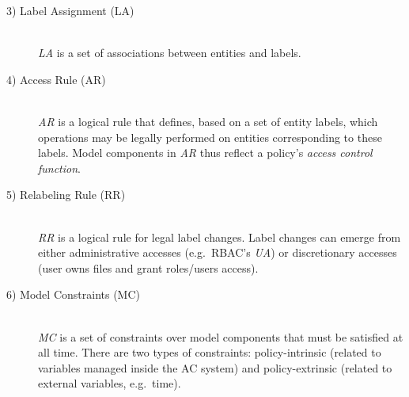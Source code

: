 \documentclass[twoside, openright, 12pt]{book}
\begin{document}
\begin{description}
\item[3) Label Assignment (LA)]\hfill \\
\textit{LA} is a set of associations between entities and labels.


\item[4) Access Rule (AR)]\hfill \\
\textit{AR} is a logical rule that defines, based on a set of entity labels, which operations may be legally performed on entities corresponding to these labels. Model components in \textit{AR} thus reflect a policy’s \textit{access control function}.


\item[5) Relabeling Rule (RR)]\hfill \\
\textit{RR} is a logical rule for legal label changes.
Label changes can emerge from either administrative accesses (e.g.~RBAC's \textit{UA}) or discretionary accesses (user owns files and grant roles/users access).


\item[6) Model Constraints (MC)]\hfill \\
\textit{MC} is a set of constraints over model components that must be satisfied at all time.
There are two types of constraints: policy-intrinsic (related to variables managed inside the AC system) and policy-extrinsic (related to external variables, e.g.~time).


\end{description}
\end{document}
